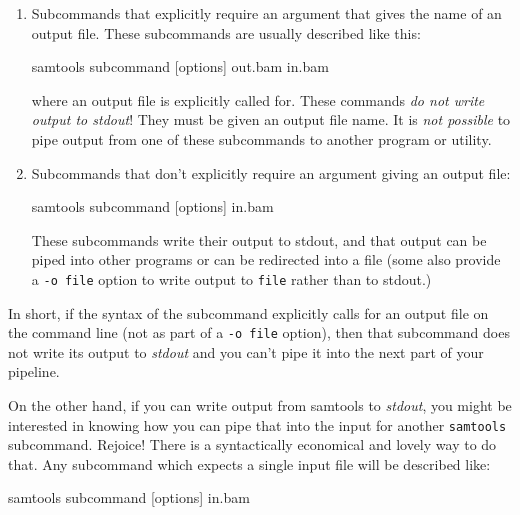 \documentclass[]{krantz}
\makeatletter
\newenvironment{Shaded}{\begin{snugshade}}{\end{snugshade}}
\newcommand{\ExtensionTok}[1]{#1}
\newcommand{\NormalTok}[1]{#1}
\newenvironment{kframe}{%
\medskip{}
\setlength{\fboxsep}{.8em}
 \def\at@end@of@kframe{}%
 \ifinner\ifhmode%
  \def\at@end@of@kframe{\end{minipage}}%
  \begin{minipage}{\columnwidth}%
 \fi\fi%
 \def\FrameCommand##1{\hskip\@totalleftmargin \hskip-\fboxsep
 \colorbox{shadecolor}{##1}\hskip-\fboxsep
     \hskip-\linewidth \hskip-\@totalleftmargin \hskip\columnwidth}%
 \MakeFramed {\advance\hsize-\width
   \@totalleftmargin\z@ \linewidth\hsize
   \@setminipage}}%
 {\par\unskip\endMakeFramed%
 \at@end@of@kframe}
\renewenvironment{Shaded}{\begin{kframe}}{\end{kframe}}
\makeatother
\begin{document}
\begin{enumerate}
\def\labelenumi{\arabic{enumi}.}
\item
  Subcommands that explicitly require an argument that gives the name of an output file.
  These subcommands are usually described like this:

\begin{Shaded}
\begin{Highlighting}[]
\ExtensionTok{samtools}\NormalTok{ subcommand [options] out.bam in.bam}
\end{Highlighting}
\end{Shaded}

  where an output file is explicitly called for. These commands
  \emph{do not write output to stdout}! They must be given an output file name. It is
  \emph{not possible} to pipe output from one of these subcommands to another program or utility.
\item
  Subcommands that don't explicitly require an argument giving an output file:

\begin{Shaded}
\begin{Highlighting}[]
\ExtensionTok{samtools}\NormalTok{ subcommand [options] in.bam}
\end{Highlighting}
\end{Shaded}

  These subcommands write their output to stdout, and that output can be piped into other programs or can
  be redirected into a file (some also provide a \texttt{-o\ file} option to write output to \texttt{file} rather than
  to stdout.)
\end{enumerate}

In short, if the syntax of the subcommand explicitly calls for an output file on the command line (not as part
of a \texttt{-o\ file} option), then that subcommand does not write its output to \emph{stdout} and you can't pipe it into
the next part of your pipeline.

On the other hand, if you can write output from samtools to \emph{stdout}, you might be interested in knowing
how you can pipe that into the input for another \texttt{samtools} subcommand. Rejoice! There is a syntactically
economical and lovely way to do that. Any subcommand which expects a single input file will be described
like:

\begin{Shaded}
\begin{Highlighting}[]
\ExtensionTok{samtools}\NormalTok{ subcommand [options]  in.bam}
\end{Highlighting}
\end{Shaded}
\end{document}
